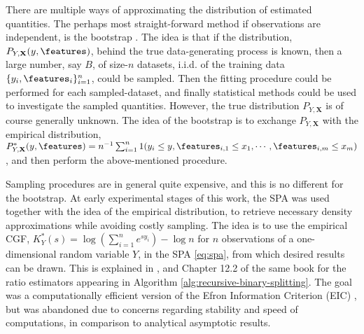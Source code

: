 There are multiple ways of approximating the distribution of estimated quantities.
The perhaps most straight-forward method if observations are independent, is the bootstrap \citep{efron1992bootstrap}.
The idea is that if the distribution, $P_{Y,\mathbf{X}}(y,\features)$, behind the true data-generating process is known, then a large number, say $B$, of size-$n$ datasets, i.i.d. of the training data $\{y_i,\features_i\}_{i=1}^n$, could be sampled.
Then the fitting procedure could be performed for each sampled-dataset, and finally statistical methods could be used to investigate the sampled quantities.
However, the true distribution $P_{Y,\mathbf{X}}$ is of course generally unknown.
The idea of the bootstrap is to exchange $P_{Y,\mathbf{X}}$ with the empirical distribution, $P_{Y,\mathbf{X}}^*(y,\features)=n^{-1}\sum_{i=1}^{n}1(y_i\leq y, \features_{i,1}\leq x_1,\cdots,\features_{i,m}\leq x_m)$, and then perform the above-mentioned procedure.

Sampling procedures are in general quite expensive, and this is no different for the bootstrap.
At early experimental stages of this work, the SPA was used together with the idea of the empirical distribution, to retrieve necessary density approximations while avoiding costly sampling.
The idea is to use the empirical CGF, $K_Y^*(s)=\log\left(\sum_{i=1}^{n} e^{sy_i}\right)-\log n$ for $n$ observations of a one-dimensional random variable $Y$, in the SPA \eqref{eq:spa}, from which desired results can be drawn. 
This is explained in \citet[Chapter 14]{butler2007saddlepoint}, and Chapter 12.2 of the same book for the ratio estimators appearing in Algorithm \ref{alg:recursive-binary-splitting}.
The goal was a computationally efficient version of the Efron Information Criterion (EIC) \citep{ishiguro1997bootstrapping}, but was abandoned due to concerns regarding stability and speed of computations, in comparison to analytical asymptotic results.

